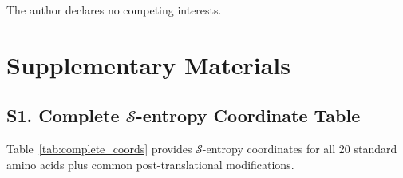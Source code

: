 \documentclass[11pt,twocolumn]{article}
\newcommand{\sentropy}{$\mathcal{S}$-entropy}
\begin{document}
The author declares no competing interests.




\clearpage
\onecolumn
\appendix
\section*{Supplementary Materials}

\subsection*{S1. Complete \texorpdfstring{\sentropy{}}{S-Entropy} Coordinate Table}

Table~\ref{tab:complete_coords} provides \sentropy{} coordinates for all 20 standard amino acids plus common post-translational modifications.
\end{document}
